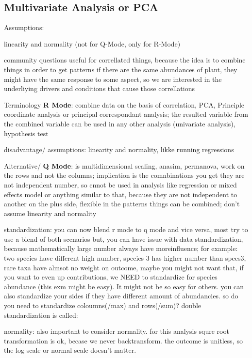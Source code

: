 \documentclass[]{article}
\begin{document}
\subsection{Multivariate Analysis or
PCA}\label{multivariate-analysis-or-pca}

Assumptions:

linearity and normality (not for Q-Mode, only for R-Mode)

community questions useful for correllated things, because the idea is
to combine things in order to get patterns if there are the same
abundances of plant, they might have the same response to some aspect,
so we are interested in the underliying drivers and conditions that
cause those correllations

Terminology \textbf{R Mode}: combine data on the basis of correlation,
PCA, Principle coordinate analysis or principal correspondant analysis;
the resulted variable from the combined variable can be used in any
other analysis (univariate analysis), hypothesis test

disadvantage/ assumptions: linearity and normality, likke running
regressions

Alternative/ \textbf{Q Mode}: is multidimensional scaling, anasim,
permanova, work on the rows and not the columns; implication is the
comnbinations you get they are not independent number, so cnnot be used
in analysis like regression or mixed effects model or anything similar
to that, because they are not independent to another on the plus side,
flexible in the patterns things can be combined; don't assume linearity
and normality

standardization: you can now blend r mode to q mode and vice versa, most
try to use a blend of both scenarios but, you can have issue with data
standardization, because mathematically large number always have
moreinfluence; for example: two species have different high number,
species 3 has higher number than specs3, rare taxa have almsot no weight
on outcome, maybe you might not want that, if you want to even up
contributions, we NEED to standardize for species abundance (this exm
might be easy). It might not be so easy for others. you can also
standardize your sides if they have different amount of abundancies. so
do you need to standardize coloumns(/max) and rows(/sum)? double
standardization is called:

normality: also important to consider normality. for this analysis squre
root transformation is ok, becase we never backtransform. the outcome is
unitless, so the log scale or normal scale doesn't matter.
\end{document}
